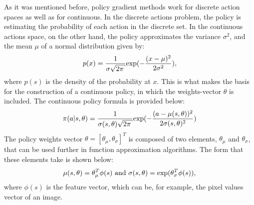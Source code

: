 As it was mentioned before, policy gradient methods work for discrete action spaces as well as for continuous. In the discrete actions problem, the policy is estimating the probability of each action in the discrete set. In the continuous actions space, on the other hand, the policy approximates the variance $\sigma^2$, and the mean $\mu$ of a normal distribution given by:
\begin{equation}\label{normalDistrib}
p(x)=\frac{1}{\sigma \sqrt{2\pi}}\textup{exp}(-\frac{(x-\mu)^2}{2\sigma ^2}),
\end{equation}
where $p(s)$ is the density of the probability at $x$. This is what makes the basis for the construction of a continuous policy, in which the weights-vector $\theta$ is included. The continuous policy formula is provided below:
\begin{equation}\label{continuousPolicy}
\pi(a|s,\theta)=\frac{1}{\sigma (s,\theta) \sqrt{2\pi}}\textup{exp}(-\frac{(a-\mu(s,\theta))^2}{2\sigma(s,\theta) ^2})
\end{equation}
The policy weights vector $\theta=[\theta_{\mu}, \theta_{\sigma}]^T$ is composed of two elements, $\theta_{\mu}$ and $\theta_{\sigma}$, that can be used further in function approximation algorithms. The form that these elements take is shown below:
\begin{equation}\label{mean}
\mu(s,\theta) = \theta_{\mu}^T\phi(s) \textup{    and    }
\sigma(s,\theta) = \textup{exp} (\theta_{\sigma}^T\phi(s)),
\end{equation}
where $\phi(s)$ is the feature vector, which can be, for example, the pixel values vector of an image.